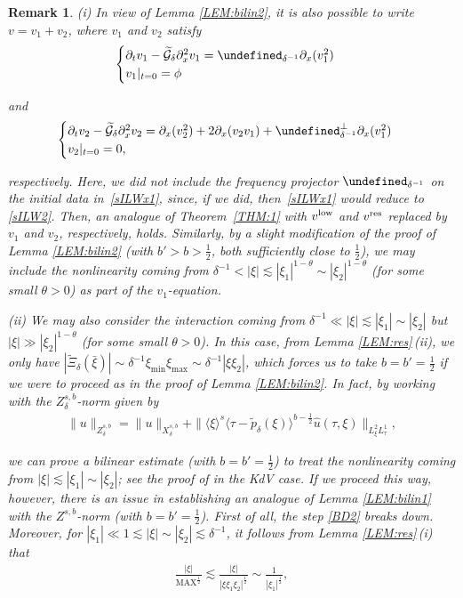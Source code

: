 \documentclass[letterpaper, 11pt,  reqno]{amsart}
\newtheorem{remark}[theorem]{Remark}
\DeclareMathOperator{\MAX}{MAX}
\newcommand{\1}{\hspace{0.5mm}\textup{I}\hspace{0.5mm}}
\newcommand{\noi}{\noindent}
\let\P= \undefined
\newcommand{\P}{\mathbf{P}}
\newcommand{\low}{\textup{low}}
\newcommand{\high}{\textup{res}}
\newcommand{\dl}{\delta}
\newcommand{\ft}{\widehat}
\newcommand{\wt}{\widetilde}
\newcommand{\dx}{\partial_x}
\newcommand{\dt}{\partial_t}
\newcommand{\ta}{\theta}
\newcommand{\Gd}{\wt{\mathcal{G}}_\dl}
\newcommand{\les}{\lesssim}
\newcommand{\jb}[1]
{\langle #1 \rangle}
\numberwithin{equation}{section}
\numberwithin{theorem}{section}
\begin{document}
\begin{remark}\label{REM:low3}\rm
(i)  In view of Lemma \ref{LEM:bilin2}, 
it is also possible to write $v = v_1 + v_2$, 
where 
$v_1$ and $v_2$ satisfy
\begin{align}
\begin{cases}
\dt v_1  -     \Gd   \dx^2 v_1= \P_{ \dl^{-1}} \dx(v_1^2)\\
v_1|_{t = 0} =  \phi
\end{cases}
\label{sILWx1}
\end{align}

\noi
and
\begin{align*}
\begin{cases}
\dt v_2   -     \Gd   \dx^2 v_2= \dx(v_2^2)
+ 2\dx(v_2 v_1)
+  \P_{ \dl^{-1}}^\perp \dx(v_1^2)\\
v_2|_{t = 0} = 0, 
\end{cases}
\end{align*}

\noi
respectively.
Here, we did not include the frequency projector
$\P_{ \dl^{-1}}$ on the initial data in~\eqref{sILWx1}, 
since, if we did, then~\eqref{sILWx1} would reduce
to \eqref{sILW2}.
Then, an analogue of Theorem~\ref{THM:1}
with $v^\low$ and $v^\high$ replaced
by $v_1$ and $v_2$, respectively, holds.
Similarly, by a slight modification
of the proof of Lemma \ref{LEM:bilin2}
(with $b' > b > \frac12$, both sufficiently close to $\frac 12$), 
we may include 
the nonlinearity coming from 
$ \dl^{-1} < |\xi| \les |\xi_1|^{1-\ta} \sim |\xi_2|^{1-\ta}$
(for some small $\ta > 0$)
as part of the $v_1$-equation.



\medskip

\noi
(ii)
We may also consider the interaction coming from 
$ \dl^{-1} \ll |\xi| \les |\xi_1| \sim |\xi_2|$
but $|\xi| \gg |\xi_2|^{1-\ta}$
(for some small $\ta > 0$).
In this case, 
from Lemma \ref{LEM:res}\,(ii), we only have
$|\wt \Xi_\dl(\bar \xi)|
\sim    \dl^{-1} \xi_{\min}\xi_{\max}
\sim \dl^{-1} |\xi\xi_{2}|$,
which forces us to take $b = b' = \frac 12$
if we were to proceed as in the proof of Lemma \ref{LEM:bilin2}.
In fact, by working with the $Z_\dl^{s, b}$-norm given by 
\begin{align*}
\|u \|_{Z^{s, b}_\dl} = 
\|u \|_{X^{s, b}_\dl} 
+ 
\|\jb{\xi}^s \jb{\tau - \wt p_\dl(\xi)}^{b- \frac 12} \ft u(\tau, \xi)\|_{L^2_{\xi}L^1_\tau}, 
\end{align*}

\noi
we can prove a bilinear estimate (with $b = b' = \frac 12$)
to treat the nonlinearity coming from 
$ |\xi| \les |\xi_1| \sim |\xi_2|$;
see the proof of 
\cite[Theorem 3.19]{ETz2}
in the KdV case.
If we proceed this way, however, 
there is an issue in establishing 
an analogue of Lemma \ref{LEM:bilin1}
with the $Z^{s, b}$-norm (with $b = b' = \frac 12$).
First of all, the step \eqref{BD2} breaks down.
Moreover, for $|\xi_1|\ll 1 \les |\xi|\sim |\xi_2| \les \dl^{-1}$, 
it follows from Lemma \ref{LEM:res}\,(i) that 
\begin{align*}
\frac{ |\xi|}{\MAX^\frac 12 }
\les \frac{|\xi|}{|\xi\xi_1\xi_2|^\frac 12 }
\sim \frac{1}{|\xi_1|^\frac 12}, 
\end{align*}


\end{remark}
\end{document}
